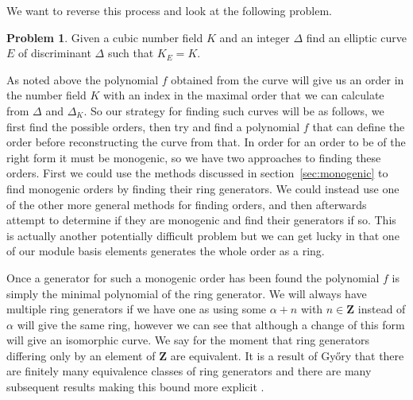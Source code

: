 \documentclass[12pt,a4paper,abstracton,bibtotoc]{scrreprt}
\theoremstyle{definition}
\newtheorem{prob}{Problem}
\newcommand{\ZZ}{\mathbf{Z}}
\begin{document}
We want to reverse this process and look at the following problem.

\begin{prob}
Given a cubic number field $K$ and an integer $\Delta$ find an elliptic curve $E$ of discriminant $\Delta$ such that $K_E = K$.
\end{prob}

As noted above the polynomial $f$ obtained from the curve will give us an order in the number field $K$ with an index in the maximal order that we can calculate from $\Delta$ and $\Delta_K$.
So our strategy for finding such curves will be as follows, we first find the possible orders, then try and find a polynomial $f$ that can define the order before reconstructing the curve from that.
In order for an order to be of the right form it must be monogenic, so we have two approaches to finding these orders.
First we could use the methods discussed in section~\ref{sec:monogenic} to find monogenic orders by finding their ring generators.
We could instead use one of the other more general methods for finding orders, and then afterwards attempt to determine if they are monogenic and find their generators if so.
This is actually another potentially difficult problem but we can get lucky in that one of our module basis elements generates the whole order as a ring.

Once a generator for such a monogenic order has been found the polynomial $f$ is simply the minimal polynomial of the ring generator.
We will always have multiple ring generators if we have one as using some $\alpha + n$ with $n\in \ZZ$ instead of $\alpha$ will give the same ring, however we can see that although a change of this form will give an isomorphic curve.
We say for the moment that ring generators differing only by an element of $\ZZ$ are equivalent.
It is a result of Gy\H{o}ry that there are finitely many equivalence classes of ring generators and there are many subsequent results making this bound more explicit \cite{monogenic}.

\end{document}
